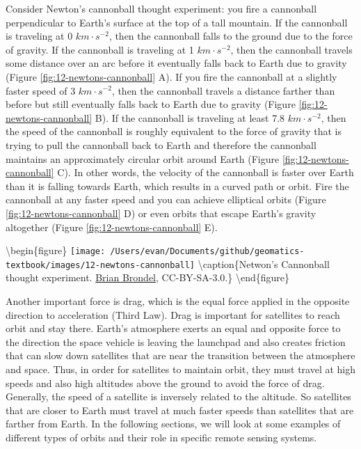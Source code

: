 \documentclass[
]{book}
\begin{document}
Consider Newton's cannonball thought experiment: you fire a cannonball perpendicular to Earth's surface at the top of a tall mountain. If the cannonball is traveling at 0 \(km·s^{-2}\), then the cannonball falls to the ground due to the force of gravity. If the cannonball is traveling at 1 \(km·s^{-2}\), then the cannonball travels some distance over an arc before it eventually falls back to Earth due to gravity (Figure \ref{fig:12-newtons-cannonball} A). If you fire the cannonball at a slightly faster speed of 3 \(km·s^{-2}\), then the cannonball travels a distance farther than before but still eventually falls back to Earth due to gravity (Figure \ref{fig:12-newtons-cannonball} B). If the cannonball is traveling at least 7.8 \(km·s^{-2}\), then the speed of the cannonball is roughly equivalent to the force of gravity that is trying to pull the cannonball back to Earth and therefore the cannonball maintains an approximately circular orbit around Earth (Figure \ref{fig:12-newtons-cannonball} C). In other words, the velocity of the cannonball is faster over Earth than it is falling towards Earth, which results in a curved path or orbit. Fire the cannonball at any faster speed and you can achieve elliptical orbits (Figure \ref{fig:12-newtons-cannonball} D) or even orbits that escape Earth's gravity altogether (Figure \ref{fig:12-newtons-cannonball} E).

\textbackslash begin\{figure\}
\texttt{[image: /Users/evan/Documents/github/geomatics-textbook/images/12-newtons-cannonball]} \textbackslash caption\{Netwon's Cannonball thought experiment. \href{https://upload.wikimedia.org/wikipedia/commons/archive/7/73/20070210061321\%21Newton_Cannon.svg}{Brian Brondel}, CC-BY-SA-3.0.\}\label{fig:12-newtons-cannonball}
\textbackslash end\{figure\}

Another important force is drag, which is the equal force applied in the opposite direction to acceleration (Third Law). Drag is important for satellites to reach orbit and stay there. Earth's atmosphere exerts an equal and opposite force to the direction the space vehicle is leaving the launchpad and also creates friction that can slow down satellites that are near the transition between the atmosphere and space. Thus, in order for satellites to maintain orbit, they must travel at high speeds and also high altitudes above the ground to avoid the force of drag. Generally, the speed of a satellite is inversely related to the altitude. So satellites that are closer to Earth must travel at much faster speeds than satellites that are farther from Earth. In the following sections, we will look at some examples of different types of orbits and their role in specific remote sensing systems.
\end{document}
